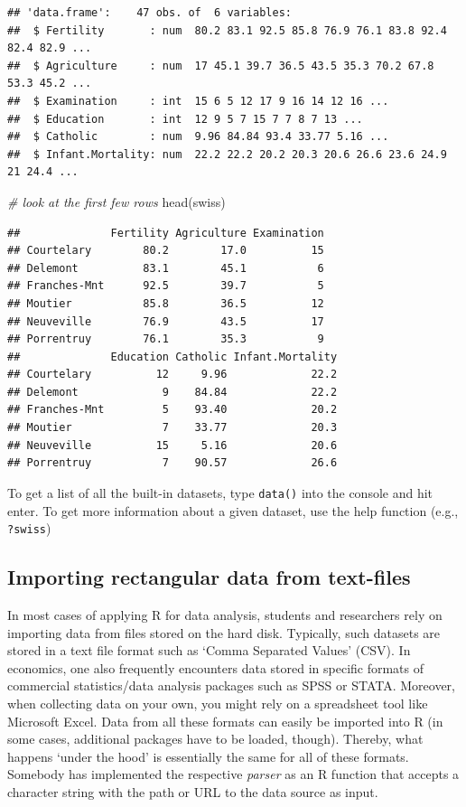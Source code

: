 \documentclass[
  12pt,
]{style/krantz}
\newenvironment{Shaded}{\begin{snugshade}}{\end{snugshade}}
\newcommand{\CommentTok}[1]{\textcolor[rgb]{0.56,0.35,0.01}{\textit{#1}}}
\newcommand{\FunctionTok}[1]{\textcolor[rgb]{0.00,0.00,0.00}{#1}}
\newcommand{\NormalTok}[1]{#1}
\begin{document}
\begin{verbatim}
## 'data.frame':    47 obs. of  6 variables:
##  $ Fertility       : num  80.2 83.1 92.5 85.8 76.9 76.1 83.8 92.4 82.4 82.9 ...
##  $ Agriculture     : num  17 45.1 39.7 36.5 43.5 35.3 70.2 67.8 53.3 45.2 ...
##  $ Examination     : int  15 6 5 12 17 9 16 14 12 16 ...
##  $ Education       : int  12 9 5 7 15 7 7 8 7 13 ...
##  $ Catholic        : num  9.96 84.84 93.4 33.77 5.16 ...
##  $ Infant.Mortality: num  22.2 22.2 20.2 20.3 20.6 26.6 23.6 24.9 21 24.4 ...
\end{verbatim}

\begin{Shaded}
\begin{Highlighting}[]
\CommentTok{\# look at the first few rows}
\FunctionTok{head}\NormalTok{(swiss)}
\end{Highlighting}
\end{Shaded}

\begin{verbatim}
##              Fertility Agriculture Examination
## Courtelary        80.2        17.0          15
## Delemont          83.1        45.1           6
## Franches-Mnt      92.5        39.7           5
## Moutier           85.8        36.5          12
## Neuveville        76.9        43.5          17
## Porrentruy        76.1        35.3           9
##              Education Catholic Infant.Mortality
## Courtelary          12     9.96             22.2
## Delemont             9    84.84             22.2
## Franches-Mnt         5    93.40             20.2
## Moutier              7    33.77             20.3
## Neuveville          15     5.16             20.6
## Porrentruy           7    90.57             26.6
\end{verbatim}

To get a list of all the built-in datasets, type \texttt{data()} into the console and hit enter. To get more information about a given dataset, use the help function (e.g., \texttt{?swiss})

\hypertarget{importing-rectangular-data-from-text-files}{%
\subsection{Importing rectangular data from text-files}\label{importing-rectangular-data-from-text-files}}

In most cases of applying R for data analysis, students and researchers rely on importing data from files stored on the hard disk. Typically, such datasets are stored in a text file format such as `Comma Separated Values' (CSV). In economics, one also frequently encounters data stored in specific formats of commercial statistics/data analysis packages such as SPSS or STATA. Moreover, when collecting data on your own, you might rely on a spreadsheet tool like Microsoft Excel. Data from all these formats can easily be imported into R (in some cases, additional packages have to be loaded, though). Thereby, what happens `under the hood' is essentially the same for all of these formats. Somebody has implemented the respective \emph{parser} as an R function that accepts a character string with the path or URL to the data source as input.
\end{document}
